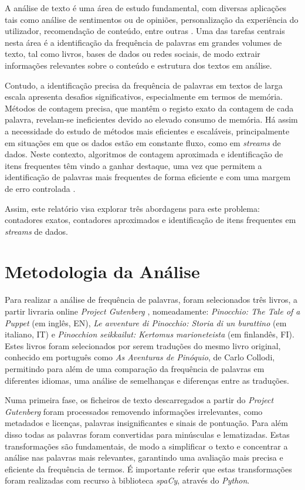\documentclass[mirror, portugues]{revdetua}
\begin{document}
A análise de texto é uma área de estudo fundamental, com diversas aplicações tais como análise de sentimentos ou de opiniões, personalização da experiência do utilizador, recomendação de conteúdo, entre outras \cite{AZ24}. Uma das tarefas centrais nesta área é a identificação da frequência de palavras em grandes volumes de texto, tal como livros, bases de dados ou redes sociais, de modo extrair informações relevantes sobre o conteúdo e estrutura dos textos em análise.

Contudo, a identificação precisa da frequência de palavras em textos de larga escala apresenta desafios significativos, especialmente em termos de memória. Métodos de contagem precisa, que mantêm o registo exato da contagem de cada palavra, revelam-se ineficientes devido ao elevado consumo de memória. Há assim a necessidade do estudo de métodos mais eficientes e escaláveis, principalmente em situações em que os dados estão em constante fluxo, como em \textit{streams} de dados. Neste contexto, algoritmos de contagem aproximada e identificação de itens frequentes têm vindo a ganhar destaque, uma vez que permitem a identificação de palavras mais frequentes de forma eficiente e com uma margem de erro controlada \cite{LH06}.

Assim, este relatório visa explorar três abordagens para este problema: contadores exatos, contadores aproximados e identificação de itens frequentes em \textit{streams} de dados.

\section{Metodologia da Análise}

Para realizar a análise de frequência de palavras, foram selecionados três livros, a partir livraria online \textit{Project Gutenberg} \cite{PG24}, nomeadamente: \textit{Pinocchio: The Tale of a Puppet} (em inglês, EN), \textit{Le avventure di Pinocchio: Storia di un burattino} (em italiano, IT) e \textit{Pinocchion seikkailut: Kertomus marioneteista} (em finlandês, FI). Estes livros foram selecionados por serem traduções do mesmo livro original, conhecido em português como \textit{As Aventuras de Pinóquio}, de Carlo Collodi, permitindo para além de uma comparação da frequência de palavras em diferentes idiomas, uma análise de semelhanças e diferenças entre as traduções.

Numa primeira fase, os ficheiros de texto descarregados a partir do \textit{Project Gutenberg} foram processados removendo informações irrelevantes, como metadados e licenças, palavras insignificantes e sinais de pontuação. Para além disso todas as palavras foram convertidas para minúsculas e lematizadas. Estas transformações são fundamentais, de modo a simplificar o texto e concentrar a análise nas palavras mais relevantes, garantindo uma avaliação mais precisa e eficiente da frequência de termos. É importante referir que estas transformações foram realizadas com recurso à biblioteca \textit{spaCy}, através do \textit{Python}.
\end{document}
